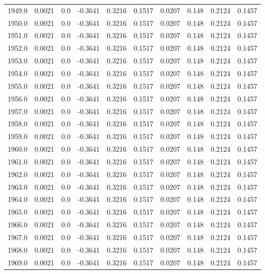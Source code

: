 \begin{longtable}{lrrrrrrrrr}
1949.0 & 0.0021 & 0.0 & -0.3641 & 0.3216 & 0.1517 & 0.0207 & 0.148 & 0.2124 & 0.1457 \\
1950.0 & 0.0021 & 0.0 & -0.3641 & 0.3216 & 0.1517 & 0.0207 & 0.148 & 0.2124 & 0.1457 \\
1951.0 & 0.0021 & 0.0 & -0.3641 & 0.3216 & 0.1517 & 0.0207 & 0.148 & 0.2124 & 0.1457 \\
1952.0 & 0.0021 & 0.0 & -0.3641 & 0.3216 & 0.1517 & 0.0207 & 0.148 & 0.2124 & 0.1457 \\
1953.0 & 0.0021 & 0.0 & -0.3641 & 0.3216 & 0.1517 & 0.0207 & 0.148 & 0.2124 & 0.1457 \\
1954.0 & 0.0021 & 0.0 & -0.3641 & 0.3216 & 0.1517 & 0.0207 & 0.148 & 0.2124 & 0.1457 \\
1955.0 & 0.0021 & 0.0 & -0.3641 & 0.3216 & 0.1517 & 0.0207 & 0.148 & 0.2124 & 0.1457 \\
1956.0 & 0.0021 & 0.0 & -0.3641 & 0.3216 & 0.1517 & 0.0207 & 0.148 & 0.2124 & 0.1457 \\
1957.0 & 0.0021 & 0.0 & -0.3641 & 0.3216 & 0.1517 & 0.0207 & 0.148 & 0.2124 & 0.1457 \\
1958.0 & 0.0021 & 0.0 & -0.3641 & 0.3216 & 0.1517 & 0.0207 & 0.148 & 0.2124 & 0.1457 \\
1959.0 & 0.0021 & 0.0 & -0.3641 & 0.3216 & 0.1517 & 0.0207 & 0.148 & 0.2124 & 0.1457 \\
1960.0 & 0.0021 & 0.0 & -0.3641 & 0.3216 & 0.1517 & 0.0207 & 0.148 & 0.2124 & 0.1457 \\
1961.0 & 0.0021 & 0.0 & -0.3641 & 0.3216 & 0.1517 & 0.0207 & 0.148 & 0.2124 & 0.1457 \\
1962.0 & 0.0021 & 0.0 & -0.3641 & 0.3216 & 0.1517 & 0.0207 & 0.148 & 0.2124 & 0.1457 \\
1963.0 & 0.0021 & 0.0 & -0.3641 & 0.3216 & 0.1517 & 0.0207 & 0.148 & 0.2124 & 0.1457 \\
1964.0 & 0.0021 & 0.0 & -0.3641 & 0.3216 & 0.1517 & 0.0207 & 0.148 & 0.2124 & 0.1457 \\
1965.0 & 0.0021 & 0.0 & -0.3641 & 0.3216 & 0.1517 & 0.0207 & 0.148 & 0.2124 & 0.1457 \\
1966.0 & 0.0021 & 0.0 & -0.3641 & 0.3216 & 0.1517 & 0.0207 & 0.148 & 0.2124 & 0.1457 \\
1967.0 & 0.0021 & 0.0 & -0.3641 & 0.3216 & 0.1517 & 0.0207 & 0.148 & 0.2124 & 0.1457 \\
1968.0 & 0.0021 & 0.0 & -0.3641 & 0.3216 & 0.1517 & 0.0207 & 0.148 & 0.2124 & 0.1457 \\
1969.0 & 0.0021 & 0.0 & -0.3641 & 0.3216 & 0.1517 & 0.0207 & 0.148 & 0.2124 & 0.1457 \\

\end{longtable}
